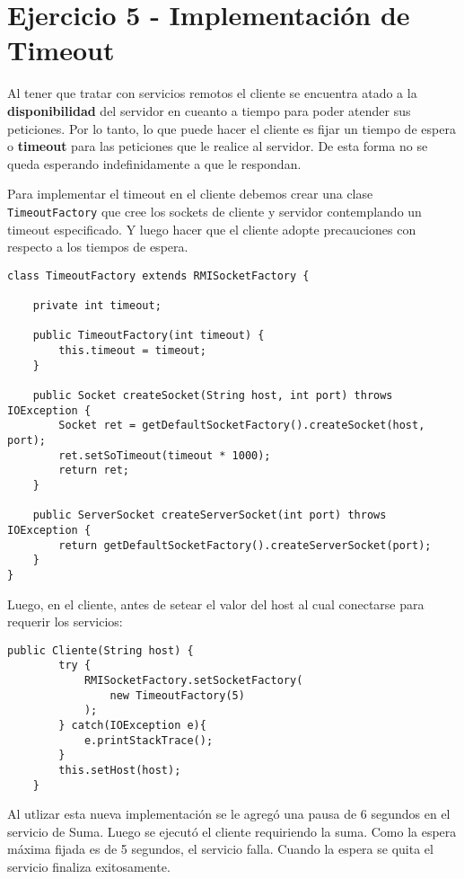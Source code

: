 \section{Ejercicio 5 - Implementación de Timeout}

Al tener que tratar con servicios remotos el cliente se encuentra atado a la \textbf{disponibilidad} del servidor en cueanto a tiempo para poder atender sus peticiones. Por lo tanto, lo que puede hacer el cliente es fijar un tiempo de espera o \textbf{timeout} para las peticiones que le realice al servidor. De esta forma no se queda esperando indefinidamente a que le respondan.

Para implementar el timeout en el cliente debemos crear una clase \texttt{TimeoutFactory} que cree los sockets de cliente y servidor contemplando un timeout especificado. Y luego hacer que el cliente adopte precauciones con respecto a los tiempos de espera.

\begin{lstlisting}[title={Socket factory que contempla el \textbf{timeout} especificado}]
class TimeoutFactory extends RMISocketFactory {

    private int timeout;

    public TimeoutFactory(int timeout) {
        this.timeout = timeout;
    }

    public Socket createSocket(String host, int port) throws IOException {
        Socket ret = getDefaultSocketFactory().createSocket(host, port);
        ret.setSoTimeout(timeout * 1000);
        return ret;
    }

    public ServerSocket createServerSocket(int port) throws IOException {
        return getDefaultSocketFactory().createServerSocket(port);
    }
}
\end{lstlisting}

Luego, en el cliente, antes de setear el valor del host al cual conectarse para requerir los servicios:

\begin{lstlisting}[title={Utilizar la \texttt{TimeoutFactory} como default para la creación de sockets en el constructor de Cliente}]
    public Cliente(String host) {
        try {
            RMISocketFactory.setSocketFactory(
                new TimeoutFactory(5)
            );
        } catch(IOException e){
            e.printStackTrace();
        }
        this.setHost(host);
    }
\end{lstlisting}

Al utlizar esta nueva implementación se le agregó una pausa de 6 segundos en el servicio de Suma. Luego se ejecutó el cliente requiriendo la suma. Como la espera máxima fijada es de 5 segundos, el servicio falla. Cuando la espera se quita el servicio finaliza exitosamente.

